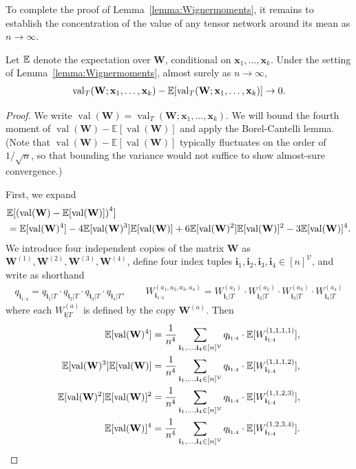 \documentclass[10pt,reqno]{amsart}
\def\x{\mathbf{x}}
\def\W{\mathbf{W}}
\def\E{\mathbb{E}}
\def\cV{\mathcal{V}}
\def\val{\operatorname{val}}
\def\bW{{\mathbf{W}}}
\def\bi{\mathbf{i}}
\begin{document}
To complete the proof of Lemma~\ref{lemma:Wignermoments},
it remains to establish the concentration of the value of any tensor 
network around its mean as $n \to \infty$.

\begin{lemma}\label{lem:Wignermoments_concentration}
Let $\mathbb{E}$ denote the expectation over $\W$, conditional on $\x_1,\ldots,\x_k$.
    Under the setting of Lemma~\ref{lemma:Wignermoments}, almost 
    surely as $n \to \infty$, 
    \begin{align*}
        \val_T(\bW; \xb_1, \ldots, \xb_k) 
        - \EE[\val_T(\bW; \xb_1, \ldots, \xb_k)] \to 0.
    \end{align*}
\end{lemma}
\begin{proof}
We write $\val(\W)=\val_T(\W;\x_1,\ldots,\x_k)$. We will bound the
fourth moment of $\val(\bW)-\E[\val(\bW)]$ and apply the Borel-Cantelli lemma.
(Note that $\val(\bW)-\E[\val(\bW)]$ typically fluctuates on the order of
$1/\sqrt{n}$, so that bounding the variance would not suffice to show
almost-sure convergence.)

First, we expand
\begin{align}
&\EE[\left(\val(\bW) - \EE[\val(\bW)]\right)^4]\nonumber\\
    &= \EE[\val(\bW)^4] - 4 \EE[\val(\bW)^3] \EE[\val(\bW)]
    + 6 \EE[\val(\bW)^2] \EE[\val(\bW)]^2 - 3 \EE[\val(\bW)]^4.
\label{eq:sym_moment_expand}
\end{align}
We introduce four independent copies of the matrix $\W$ as
$\bW^{(1)},\bW^{(2)},\bW^{(3)},\bW^{(4)}$, define four index tuples
$\bi_1,\bi_2,\bi_3,\bi_4 \in [n]^{\cV}$, and write as shorthand
\begin{align*}
q_{\bi_{1:4}}=q_{\bi_1|T} \cdot q_{\bi_2|T} \cdot q_{\bi_3|T} \cdot q_{\bi_4|T},
\qquad W_{\bi_{1:4}}^{(a_1,a_2,a_3,a_4)}
= W_{\bi_1|T}^{(a_1)} \cdot W_{\bi_2|T}^{(a_2)} \cdot W_{\bi_3|T}^{(a_3)}
\cdot W_{\bi_4|T}^{(a_4)}
\end{align*}
where each $W_{\bi|T}^{(a)}$ is defined by the copy $\W^{(a)}$. Then
\begin{align}\label{eq:sym_moments}
\begin{aligned}
    \EE[\val(\bW)^4] &= \frac{1}{n^4} \sum_{\ib_1,\ldots,\ib_4 \in [n]^{\cV}} 
    q_{\ib_{1:4}} \cdot \EE[W_{\bi_{1:4}}^{(1,1,1,1)}],\\
    \EE[\val(\bW)^3] \EE[\val(\bW)] &= \frac{1}{n^4} 
    \sum_{\ib_1,\ldots,\ib_4 \in [n]^{\cV}} 
    q_{\ib_{1:4}} \cdot \EE[W_{\bi_{1:4}}^{(1,1,1,2)}],\\
    \EE[\val(\bW)^2] \EE[\val(\bW)]^2 &= \frac{1}{n^4} 
    \sum_{\ib_1,\ldots,\ib_4 \in [n]^{\cV}} 
    q_{\ib_{1:4}} \cdot \EE[W_{\bi_{1:4}}^{(1,1,2,3)}],\\
    \EE[\val(\bW)]^4 &= \frac{1}{n^4} \sum_{\ib_1,\ldots,\ib_4 \in [n]^{\cV}} 
    q_{\ib_{1:4}} \cdot \EE[W_{\bi_{1:4}}^{(1,2,3,4)}].
\end{aligned}
\end{align}


\end{proof}
\end{document}

